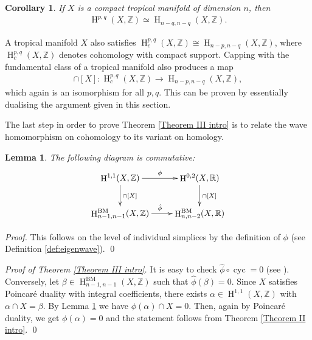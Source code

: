 \documentclass[11pt]{article}
\numberwithin{equation}{numsection}
\newcommand{\Z}{{\mathbb Z}}
\newcommand{\R}{{\mathbb R}}
\newcommand{\phihat}{\hat{\phi}}
\DeclareMathOperator{\cyc}{cyc}
\DeclareMathOperator{\BM}{BM}
\DeclareMathOperator{\HH}{H}
\newtheorem{lemma}[thm]{Lemma}
\newtheorem{cor}[thm]{Corollary}
\begin{document}
\begin{cor}\label{pdcor} 
If $X$ is a compact tropical manifold of dimension $n$, then 
\begin{align*}
\HH^{p,q}(X, \Z) \simeq \HH_{n-q,n-q}(X, \Z).
\end{align*}
\end{cor}


\begin{rem}{\rm
A tropical manifold $X$ also satisfies $\HH^{p,q}_c(X, \Z) \cong \HH_{n-p,n-q}(X, \Z)$, 
where $\HH^{p,q}_c(X, \Z) $ denotes cohomology with compact support.
Capping with the fundamental class of a tropical manifold also produces a map 
\begin{align}\label{PDotherway}
 \cap [X] \colon \HH^{p,q}_c(X, \Z) \to \HH_{n-p,n-q}(X, \Z),
\end{align}
which again is an isomorphism for all $p,q$. 
This can be proven by essentially dualising the argument given in this section.}
\end{rem}




The last step in order to prove Theorem \ref{Theorem III intro} is to relate the wave homomorphism on cohomology to its variant on homology. 

\begin{lemma}\label{lemma:wavehomomco}
The following diagram is commutative:
\begin{align*}
\begin{xy}
\xymatrix{
 \HH^{1,1}(X, \Z) \ar[d]^{\cap [X]} \ar[r]^{\phi}   &\HH^{0,2}(X, \R)    \ar[d]^{\cap [X]}    \\
   \HH^{\BM}_{n-1,n-1}(X, \Z)  \ar[r]^{\phihat}  &\HH^{\BM}_{n, n-2}(X, \R) 
 }
\end{xy}
\end{align*}
\end{lemma}

\begin{proof}
  This follows on the level of individual simplices by the definition of $\phi$ (see Definition \ref{def:eigenwave}).
  \qed
\end{proof}

\begin{proof}[Proof of Theorem \ref{Theorem III intro}]
It is easy to check $\phihat \circ \cyc = 0$ (see \cite[Theorem 5.4]{MikZhar}). 
Conversely, let $\beta \in \HH^{\BM}_{n-1,n-1}(X, \Z)$ such that $\phihat(\beta) = 0$. 
Since $X$ satisfies Poincar\'e duality with integral coefficients, 
there exists $\alpha \in  \HH^{1,1}(X, \Z)$ with $\alpha \cap X = \beta$.
By Lemma \ref{lemma:wavehomomco} we have $\phi(\alpha) \cap X = 0$.
Then, again by Poincar\'e duality, we get $\phi(\alpha) = 0$ and 
the statement follows from Theorem \ref{Theorem II intro}.
\qed
\end{proof}
\end{document}
